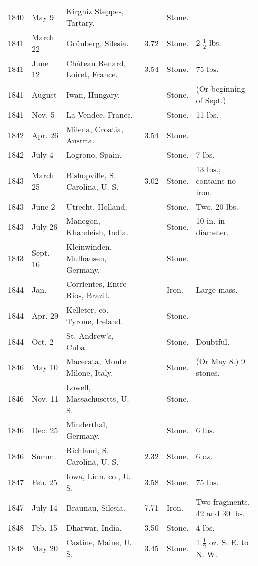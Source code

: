 \documentclass[a4paper, 12pt, oneside]{article}
\begin{document}
\begin{center}
\begin{longtable}{|p{10mm}|p{15mm}|p{32mm}|p{13mm}|p{13mm}|p{26mm}|}
        1840 & May 9 & Kirghiz Steppes, Tartary. & ~ & Stone. & ~ \\
        1841 & March 22 & Grünberg, Silesia. & 3.72 & Stone. & 2 $\frac{1}{2}$ lbs. \\
        1841 & June 12 & Château Renard, Loiret, France. & 3.54 & Stone. & 75 lbs. \\
        1841 & August & Iwan, Hungary. & ~ & Stone. & (Or beginning of Sept.) \\
        1841 & Nov. 5 & La Vendee, France. & ~ & Stone. & 11 lbs. \\
        1842 & Apr. 26 & Milena, Croatia, Austria. & 3.54 & Stone. & ~ \\
        1842 & July 4 & Logrono, Spain. & ~ & Stone. & 7 lbs. \\
        1843 & March 25 & Bishopville, S. Carolina, U. S. & 3.02 & Stone. & 13 lbs.; contains no iron. \\
        1843 & June 2 & Utrecht, Holland. & ~ & Stone. & Two, 20 lbs. \\
        1843 & July 26 & Manegon, Khandeish, India. & ~ & Stone. & 10 in. in diameter. \\
        1843 & Sept. 16 & Kleinwinden, Mulhausen, Germany. & ~ & Stone. & ~ \\
        1844 & Jan. & Corrientes, Entre Rios, Brazil. & ~ & Iron. & Large mass. \\
        1844 & Apr. 29 & Kelleter, co. Tyrone, Ireland. & ~ & Stone. & ~ \\
        1844 & Oct. 2 & St. Andrew’s, Cuba. & ~ & Stone. & Doubtful. \\
        1846 & May 10 & Macerata, Monte Milone, Italy. & ~ & Stone. & (Or May 8.) 9 stones. \\
        1846 & Nov. 11 & Lowell, Massachusetts, U. S. & ~ & Stone. & ~ \\
        1846 & Dec. 25 & Minderthal, Germany. & ~ & Stone. & 6 lbs. \\
        1846 & Summ. & Richland, S. Carolina, U. S. & 2.32 & Stone. & 6 oz. \\
        1847 & Feb. 25 & Iowa, Linn. co., U. S. & 3.58 & Stone. & 75 lbs. \\
        1847 & July 14 & Braunau, Silesia. & 7.71 & Iron. & Two fragments, 42 and 30 lbs. \\
        1848 & Feb. 15 & Dharwar, India. & 3.50 & Stone. & 4 lbs. \\
        1848 & May 20 & Castine, Maine, U. S. & 3.45 & Stone. & 1 $\frac{1}{2}$ oz. S. E. to N. W. \\

\end{longtable}
\end{center}
\end{document}
